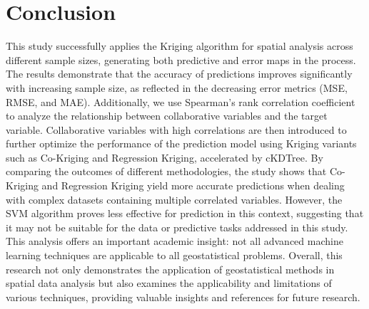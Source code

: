 \documentclass{swmcmthesis}
\begin{document}
\newpage

\section{Conclusion}

This study successfully applies the Kriging algorithm for spatial analysis across different sample sizes, generating both predictive and error maps in the process. The results demonstrate that the accuracy of predictions improves significantly with increasing sample size, as reflected in the decreasing error metrics (MSE, RMSE, and MAE). Additionally, we use Spearman’s rank correlation coefficient to analyze the relationship between collaborative variables and the target variable. Collaborative variables with high correlations are then introduced to further optimize the performance of the prediction model using Kriging variants such as Co-Kriging and Regression Kriging, accelerated by cKDTree. By comparing the outcomes of different methodologies, the study shows that Co-Kriging and Regression Kriging yield more accurate predictions when dealing with complex datasets containing multiple correlated variables. However, the SVM algorithm proves less effective for prediction in this context, suggesting that it may not be suitable for the data or predictive tasks addressed in this study. This analysis offers an important academic insight: not all advanced machine learning techniques are applicable to all geostatistical problems. Overall, this research not only demonstrates the application of geostatistical methods in spatial data analysis but also examines the applicability and limitations of various techniques, providing valuable insights and references for future research.

\newpage
\end{document}
